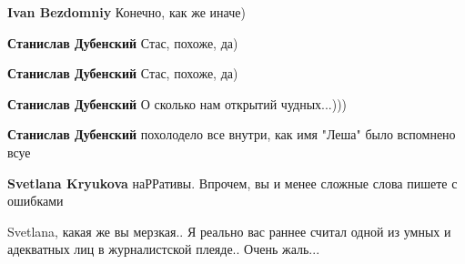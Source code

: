 \begin{itemize}
\begin{itemize}
 

\textbf{Ivan Bezdomniy}
Конечно, как же иначе)

 
\textbf{Станислав Дубенский}
Стас, похоже, да)

 

\textbf{Станислав Дубенский}
Стас, похоже, да)

 

\textbf{Станислав Дубенский}
О сколько нам открытий чудных...)))

 
\textbf{Станислав Дубенский} похолодело все внутри, как имя "Леша" было вспомнено всуе\Laughey[1.0][white]

 

\textbf{Svetlana Kryukova} наРРативы. Впрочем, вы и менее сложные слова пишете с ошибками

 
Svetlana, какая же вы мерзкая.. Я реально вас раннее считал одной из умных и адекватных лиц в журналистской плеяде.. Очень жаль...


\end{itemize}
\end{itemize}
